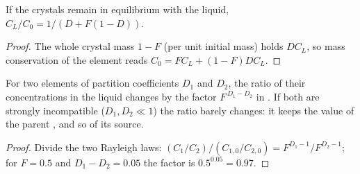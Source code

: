 \begin{proposition}
\label{prop:b2:magmatic-differentiation:equilibrium}
If the crystals remain in equilibrium with the liquid, $C_L/C_0 = 1/(D + F(1-D))$.
\end{proposition}

\begin{proof}
The whole crystal mass $1-F$ (per unit initial mass) holds $DC_L$, so mass
conservation of the element reads $C_0 = FC_L + (1-F)DC_L$.
\end{proof}

\begin{corollary}\label{cor:b2:magmatic-differentiation:ratio}
For two elements of partition coefficients $D_1$ and $D_2$, the ratio of their
concentrations in the liquid changes by the factor $F^{\,D_1-D_2}$ in . If both are strongly incompatible ($D_1, D_2 \ll 1$) the ratio
barely changes: it keeps the value of the parent , and so of its source.
\end{corollary}

\begin{proof}
Divide the two Rayleigh laws: $(C_1/C_2)/(C_{1,0}/C_{2,0}) = F^{D_1-1}/F^{D_2-1}$;
for $F = 0.5$ and $D_1 - D_2 = 0.05$ the factor is $0.5^{0.05} = 0.97$.
\end{proof}

